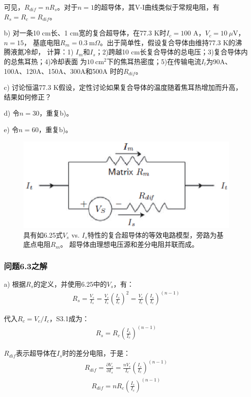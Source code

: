 可见，$R_{dif}=nR_s$。对于$n=1$的超导体，其V-I曲线类似于常规电阻，有$R_s=R_c=R_{dif}$。

b) 对一条10 cm长、1 cm宽的复合超导体，在77.3 K时$I_c=100$ A，$V_c=10\ \mu$V，$n=15$，
基底电阻$R_m=0.3\ \mathrm{m}\Omega$。出于简单性，假设复合导体由维持77.3 K的沸腾液氮冷却， 
计算：1) $I_m$和$I_s$；2)跨越10 cm长复合导体的总电压；3)复合导体内的总焦耳热；4)冷却表面
为$10\ \mathrm{cm^2}$下的焦耳热密度；5)在传输电流$I_t$为90A、100A、120A、150A、300A和500A
时的$R_{dif}$。

c) 讨论恒温77.3 K假设，定性讨论如果复合导体的温度随着焦耳热增加而升高，结果如何修正？

d) 令$n=30$，重复b)。

e) 令$n=60$，重复b)。
\begin{figure}[htbp]
	\centering
	\includegraphics[scale=0.7]{chpt6/figs/fig6.11.eps}
	\caption{具有如6.25式$V_s$ vs. $I_s$特性的复合超导体的等效电路模型，旁路为基底点电阻$R_m$。
	超导体由理想电压源和差分电阻并联而成。}
\end{figure}

\subsubsection{问题6.3之解}
a) 根据$R_s$的定义，并使用6.25中的$V_s$，有：
\begin{align*}%
R_s=\frac{V_s}{I_s}=\frac{V_c}{I_s}(\frac{I_s}{I_c})^2=\frac{V_c}{I_c}(\frac{I_s}{I_c})^{(n-1)} \tag{S3.1}
\end{align*}

代入$R_c=V_c/I_c$，S3.1成为：
\begin{align*}%
R_s=R_c(\frac{I_s}{I_c})^{(n-1)} \tag{6.26a}
\end{align*}

$R_{dif}$表示超导体在$I_s$时的差分电阻，于是：
\begin{align*}%
R_{dif}=\frac{\partial V_s}{\partial I_s}=\frac{nV_c}{I_c}(\frac{I_s}{I_c})^{(n-1)} \tag{S3.2}
\end{align*}
\begin{align*}%
R_{dif}=nR_c(\frac{I_s}{I_c})^{(n-1)} \tag{6.26a}
\end{align*}

